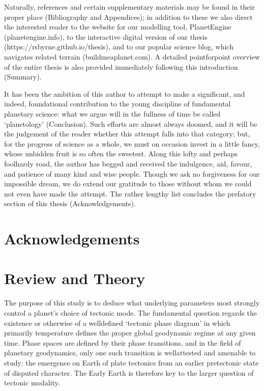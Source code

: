 \documentclass[letterpaper,10pt,english]{jupyterBook}
\begin{document}
\sphinxAtStartPar
Naturally, references and certain supplementary materials may be found in their proper place (Bibliography and Appendices); in addition to these we also direct the interested reader to the website for our modelling tool, PlanetEngine (planetengine.info), to the interactive digital version of our thesis (https://rsbyrne.github.io/thesis), and to our popular science blog, which navigates related terrain (buildmeaplanet.com). A detailed point\sphinxhyphen{}for\sphinxhyphen{}point overview of the entire thesis is also provided immediately following this introduction (Summary).

\sphinxAtStartPar
It has been the ambition of this author to attempt to make a significant, and indeed, foundational contribution to the young discipline of fundamental planetary science: what we argue will in the fullness of time be called ‘planetology’ (Conclusion). Such efforts are almost always doomed, and it will be the judgement of the reader whether this attempt falls into that category; but, for the progress of science as a whole, we must on occasion invest in a little fancy, whose unbidden fruit is so often the sweetest. Along this lofty and perhaps foolhardy road, the author has begged and received the indulgence, aid, favour, and patience of many kind and wise people. Though we ask no forgiveness for our impossible dream, we do extend our gratitude to those without whom we could not even have made the attempt. The rather lengthy list concludes the prefatory section of this thesis (Acknowledgements).


\chapter{Acknowledgements}
\label{\detokenize{frontmatter/acknowledgements:acknowledgements}}\label{\detokenize{frontmatter/acknowledgements::doc}}

\chapter{Review and Theory}
\label{\detokenize{content/chapter_01_background/main:review-and-theory}}\label{\detokenize{content/chapter_01_background/main::doc}}
\sphinxAtStartPar
The purpose of this study is to deduce what underlying parameters most strongly control a planet’s choice of tectonic mode. The fundamental question regards the existence or otherwise of a well\sphinxhyphen{}defined ‘tectonic phase diagram’ in which primarily temperature defines the proper global geodynamic regime at any given time. Phase spaces are defined by their phase transitions, and in the field of planetary geodynamics, only one such transition is well\sphinxhyphen{}attested and amenable to study: the emergence on Earth of plate tectonics from an earlier pre\sphinxhyphen{}tectonic state of disputed character. The Early Earth is therefore key to the larger question of tectonic modality.
\end{document}
